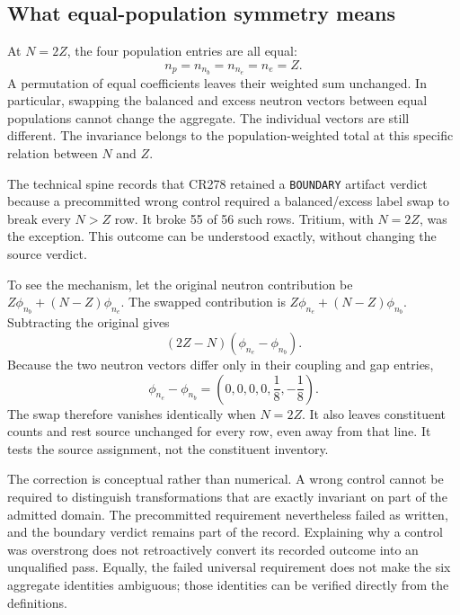 \subsection{What equal-population symmetry means}
\label{v2c4:symmetry}

At $N=2Z$, the four population entries are all equal:
\begin{equation}
 n_p=n_{n_b}=n_{n_e}=n_e=Z.
 \label{v2c4:equalpop}
\end{equation}
A permutation of equal coefficients leaves their weighted sum unchanged. In particular, swapping the balanced and excess neutron vectors between equal populations cannot change the aggregate. The individual vectors are still different. The invariance belongs to the population-weighted total at this specific relation between $N$ and $Z$.

The technical spine records that CR278 retained a \texttt{BOUNDARY} artifact verdict because a precommitted wrong control required a balanced/excess label swap to break every $N>Z$ row. It broke 55 of 56 such rows. Tritium, with $N=2Z$, was the exception.\cite{viispine} This outcome can be understood exactly, without changing the source verdict.

To see the mechanism, let the original neutron contribution be $Z\phi_{n_b}+(N-Z)\phi_{n_e}$. The swapped contribution is $Z\phi_{n_e}+(N-Z)\phi_{n_b}$. Subtracting the original gives
\begin{equation}
 (2Z-N)(\phi_{n_e}-\phi_{n_b}).
 \label{v2c4:swap}
\end{equation}
Because the two neutron vectors differ only in their coupling and gap entries,
\begin{equation}
 \phi_{n_e}-\phi_{n_b}
 =\left(0,0,0,0,\frac18,-\frac18\right).
 \label{v2c4:slotdifference}
\end{equation}
The swap therefore vanishes identically when $N=2Z$. It also leaves constituent counts and rest source unchanged for every row, even away from that line. It tests the source assignment, not the constituent inventory.

The correction is conceptual rather than numerical. A wrong control cannot be required to distinguish transformations that are exactly invariant on part of the admitted domain. The precommitted requirement nevertheless failed as written, and the boundary verdict remains part of the record. Explaining why a control was overstrong does not retroactively convert its recorded outcome into an unqualified pass. Equally, the failed universal requirement does not make the six aggregate identities ambiguous; those identities can be verified directly from the definitions.

